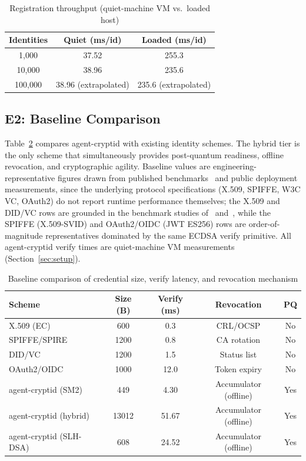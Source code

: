 \documentclass[10pt,twocolumn]{IEEEtran}
\begin{document}
\begin{table}[t]
  \caption{Registration throughput (quiet-machine VM vs.\ loaded host)}
  \label{tab:registration}
  \centering
  \begin{tabular}{ccc}
    \toprule
    \textbf{Identities} & \textbf{Quiet (ms/id)} & \textbf{Loaded (ms/id)} \\
    \midrule
    1,000 & 37.52 & 255.3 \\
    10,000 & 38.96 & 235.6 \\
    100,000 & 38.96 (extrapolated) & 235.6 (extrapolated) \\
    \bottomrule
  \end{tabular}
\end{table}

\subsection{E2: Baseline Comparison}

Table~\ref{tab:baseline} compares agent-cryptid with existing identity
schemes. The hybrid tier is the only scheme that simultaneously provides
post-quantum readiness, offline revocation, and cryptographic agility.
Baseline values are engineering-representative figures drawn from published
benchmarks~\cite{ref:x509-bench,ref:vc-bench} and public deployment
measurements, since the underlying protocol specifications (X.509, SPIFFE,
W3C VC, OAuth2) do not report runtime performance themselves; the X.509 and
DID/VC rows are grounded in the benchmark studies of~\cite{ref:x509-bench}
and~\cite{ref:vc-bench}, while the SPIFFE (X.509-SVID) and OAuth2/OIDC
(JWT ES256) rows are order-of-magnitude representatives dominated by the same
ECDSA verify primitive. All agent-cryptid verify times are quiet-machine VM
measurements (Section~\ref{sec:setup}).

\begin{table}[t]
  \caption{Baseline comparison of credential size, verify latency, and revocation mechanism}
  \label{tab:baseline}
  \centering\small
  \begin{tabular}{lcccc}
    \toprule
    \textbf{Scheme} & \textbf{Size (B)} & \textbf{Verify (ms)} & \textbf{Revocation} & \textbf{PQ} \\
    \midrule
    X.509 (EC) & 600 & 0.3 & CRL/OCSP & No \\
    SPIFFE/SPIRE & 1200 & 0.8 & CA rotation & No \\
    DID/VC & 1200 & 1.5 & Status list & No \\
    OAuth2/OIDC & 1000 & 12.0 & Token expiry & No \\
    \midrule
    agent-cryptid (SM2) & 449 & 4.30 & Accumulator (offline) & Yes \\
    agent-cryptid (hybrid) & 13012 & 51.67 & Accumulator (offline) & Yes \\
    agent-cryptid (SLH-DSA) & 608 & 24.52 & Accumulator (offline) & Yes \\
    \bottomrule
  \end{tabular}
\end{table}
\end{document}
